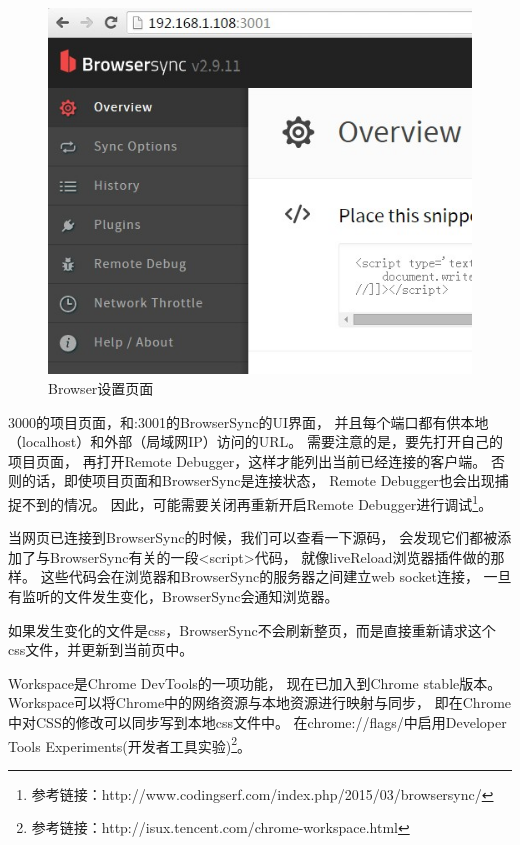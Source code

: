 \documentclass{book}
\begin{document}
\begin{figure}[htbp]
	\centering
	\includegraphics[scale=0.6]{BrowserOverviewSetting.jpg}
	\caption{Browser设置页面}
	\label{fig:BrowserOverviewSetting}
\end{figure}

3000的项目页面，和:3001的BrowserSync的UI界面，
并且每个端口都有供本地（localhost）和外部（局域网IP）访问的URL。
需要注意的是，要先打开自己的项目页面，
再打开Remote Debugger，这样才能列出当前已经连接的客户端。
否则的话，即使项目页面和BrowserSync是连接状态，
Remote Debugger也会出现捕捉不到的情况。
因此，可能需要关闭再重新开启Remote Debugger进行调试\footnote{参考链接：http://www.codingserf.com/index.php/2015/03/browsersync/}。

当网页已连接到BrowserSync的时候，我们可以查看一下源码，
会发现它们都被添加了与BrowserSync有关的一段<script>代码，
就像liveReload浏览器插件做的那样。
这些代码会在浏览器和BrowserSync的服务器之间建立web socket连接，
一旦有监听的文件发生变化，BrowserSync会通知浏览器。

如果发生变化的文件是css，BrowserSync不会刷新整页，而是直接重新请求这个css文件，并更新到当前页中。

Workspace是Chrome DevTools的一项功能，
现在已加入到Chrome stable版本。
Workspace可以将Chrome中的网络资源与本地资源进行映射与同步，
即在Chrome中对CSS的修改可以同步写到本地css文件中。
在chrome://flags/中启用Developer Tools Experiments(开发者工具实验)\footnote{参考链接：http://isux.tencent.com/chrome-workspace.html}。
\end{document}
